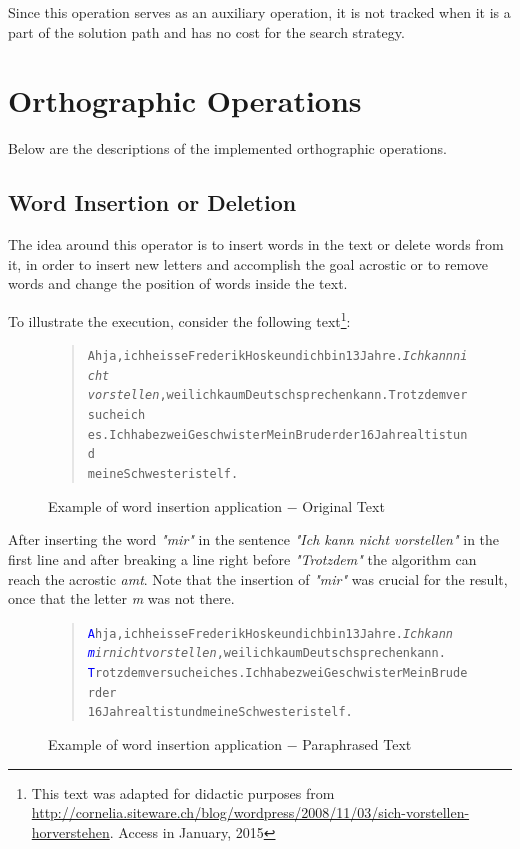 \documentclass[11pt]{reportAlternative}
\begin{document}
Since this operation serves as an auxiliary operation, it is not tracked when it is a part of the solution path and has no cost for the search strategy. 

\section{Orthographic Operations}
Below are the descriptions of the implemented orthographic operations.

\subsection{Word Insertion or Deletion}
The idea around this operator is to insert words in the text or delete words from it, in order to insert new letters and accomplish the goal acrostic or to remove words and change the position of words inside the text. \par

To illustrate the execution, consider the following text\footnote{This text was adapted for didactic purposes from \url{http://cornelia.siteware.ch/blog/wordpress/2008/11/03/sich-vorstellen-horverstehen}. Access in January, 2015}:

\begin{figure}[H]
\begin{quote}
\begin{alltt}
Ah ja, ich heisse Frederik Hoske und ich bin 13 Jahre. \textit{Ich kann nicht
vorstellen}, weil ich kaum Deutsch sprechen kann. Trotzdem versuche ich
es. Ich habe zwei Geschwister Mein Bruder der 16 Jahre alt ist und
meine Schwester ist elf.
\end{alltt}
\end{quote}
\caption{Example of word insertion application $-$ Original Text}
\end{figure}

After inserting the word \emph{"mir"} in the sentence \emph{"Ich kann nicht vorstellen"} in the first line and after breaking a line right before \emph{"Trotzdem"} the algorithm can reach the acrostic \emph{amt}. Note that the insertion of \emph{"mir"} was crucial for the result, once that the letter \emph{m} was not there.

\begin{figure}[H]
\begin{quote}
\begin{alltt}
\textcolor{Blue}{A}h ja, ich heisse Frederik Hoske und ich bin 13 Jahre. \textit{Ich kann
\textcolor{Blue}{m}ir nicht vorstellen}, weil ich kaum Deutsch sprechen kann.
\textcolor{Blue}{T}rotzdem versuche ich es. Ich habe zwei Geschwister Mein Bruder der
16 Jahre alt ist und meine Schwester ist elf.
\end{alltt}
\end{quote}
\caption{Example of word insertion application $-$ Paraphrased Text}
\end{figure}
\end{document}
